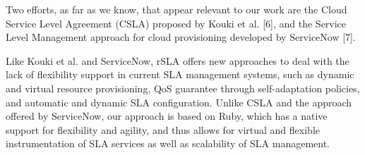  Two efforts, as far as we know, that appear relevant to our work are the Cloud Service Level Agreement (CSLA) proposed by Kouki et al. [6], and the Service Level Management approach for cloud provisioning developed by ServiceNow [7]. 
 
 Like Kouki et al. and ServiceNow, rSLA offers new approaches to deal with the lack of flexibility support in current SLA management systems, such as dynamic and virtual resource provisioning, QoS guarantee through self-adaptation policies, and automatic and dynamic SLA configuration. Unlike CSLA and the approach offered by ServiceNow, our approach is based on Ruby, which has a native support for flexibility and agility, and thus allows for virtual and flexible instrumentation of SLA services as well as scalability of SLA management.



